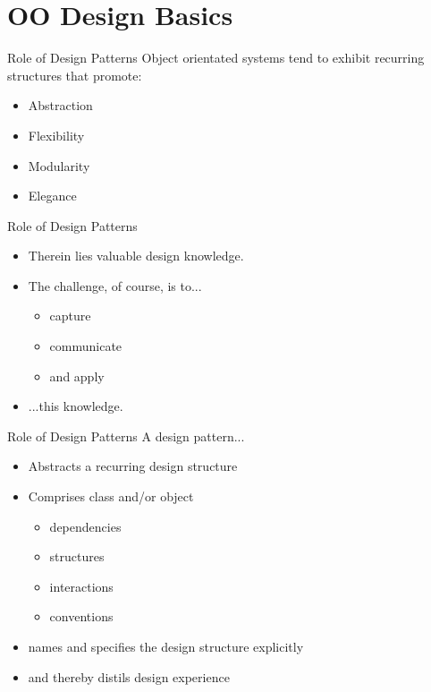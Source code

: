 \part{OO Design Basics}
\frame{\partpage}

\begin{frame}{Role of Design Patterns}
Object orientated systems tend to exhibit recurring structures that promote:

	\begin{itemize}
		\item Abstraction
		\item Flexibility
		\item Modularity
		\item Elegance
	\end{itemize}
\end{frame}

\begin{frame}{Role of Design Patterns}
	\begin{itemize}
		\item Therein lies valuable design knowledge.
		\item The challenge, of course, is to...		
		\begin{itemize}
			\item capture
			\item communicate
			\item and apply
		\end{itemize}
		\item ...this knowledge.
	\end{itemize}
\end{frame}

\begin{frame}{Role of Design Patterns}
A design pattern...

	\begin{itemize}
		\item Abstracts a recurring design structure
		\item Comprises class and/or object	
		\begin{itemize}
			\item dependencies
			\item structures
			\item interactions
			\item conventions
		\end{itemize}
		\item names and specifies the design structure explicitly
		\item and thereby distils design experience
	\end{itemize}
\end{frame}

